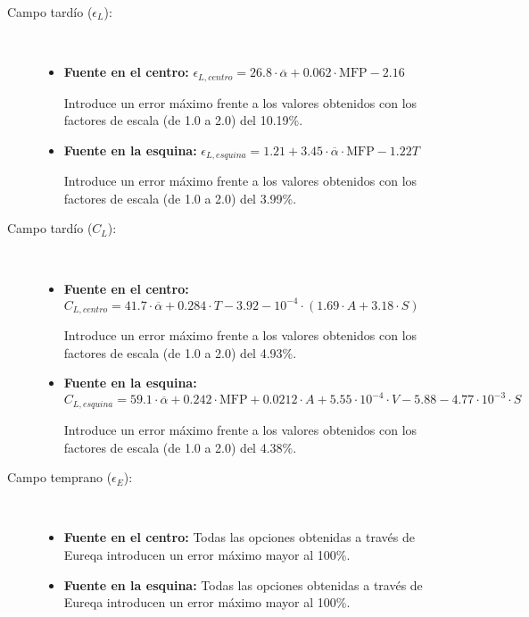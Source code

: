 \begin{description}
  \item[Campo tardío ($\epsilon_L$):]~
  
  \begin{itemize}
  \item \textbf{Fuente en el centro:} $\epsilon_{L,centro} = 26.8\cdot\overline{\alpha} + 0.062\cdot\text{MFP}-2.16$ %
  		
  		Introduce un error máximo frente a los valores obtenidos con los factores de escala (de 1.0 a 2.0) del 10.19\%.
  \item \textbf{Fuente en la esquina:} $\epsilon_{L,esquina} = 1.21 + 3.45\cdot\overline{\alpha}\cdot\text{MFP}-1.22T$ %
  		
  		Introduce un error máximo frente a los valores obtenidos con los factores de escala (de 1.0 a 2.0) del 3.99\%.
\end{itemize}

 \item[Campo tardío ($C_L$):]~
  
  \begin{itemize}
  \item \textbf{Fuente en el centro:} $C_{L,centro} = 41.7 \cdot\overline{\alpha} + 0.284\cdot T - 3.92 - 10^{-4}\cdot(1.69\cdot A+3.18\cdot S)$
  		
  		Introduce un error máximo frente a los valores obtenidos con los factores de escala (de 1.0 a 2.0) del 4.93\%.
  \item \textbf{Fuente en la esquina:} $C_{L,esquina} = 59.1 \cdot\overline{\alpha} + 0.242\cdot\text{MFP}+0.0212\cdot A+5.55\cdot10^{-4}\cdot V-5.88-4.77\cdot10^{-3}\cdot S$
  		
  		Introduce un error máximo frente a los valores obtenidos con los factores de escala (de 1.0 a 2.0) del 4.38\%.
  \end{itemize}


  \item[Campo temprano ($\epsilon_E$):]~
  
  \begin{itemize}
  \item \textbf{Fuente en el centro:} Todas las opciones obtenidas a través de Eureqa introducen un error máximo mayor al 100\%.
  \item \textbf{Fuente en la esquina:} Todas las opciones obtenidas a través de Eureqa introducen un error máximo mayor al 100\%.
\end{itemize}


\end{description}
